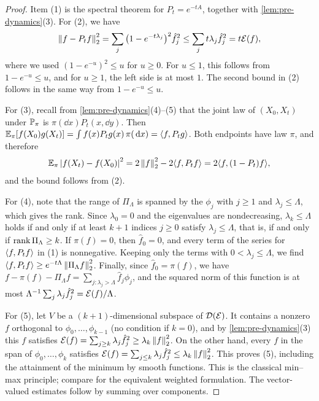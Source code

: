 \begin{proof}
Item (1) is the spectral theorem for $P_t=e^{-tA}$, together with \cref{lem:pre-dynamics}(3). For (2), we have
\[
\left\lVert f-P_tf\right\rVert_2^2=\sum_j\big(1-e^{-t\lambda_j}\big)^2\hat f_j^2\le\sum_jt\lambda_j\hat f_j^2=t\mathcal E(f),
\]
where we used $(1-e^{-u})^2\le u$ for $u\ge0$. For $u\le1$, this follows from $1-e^{-u}\le u$, and for $u\ge1$, the left side is at most $1$. The second bound in (2) follows in the same way from $1-e^{-u}\le u$.

For (3), recall from \cref{lem:pre-dynamics}(4)--(5) that the joint law of $(X_0,X_t)$ under $\mathbb P_\pi$ is $\pi(\dd x)P_t(x,\dd y)$. Then $\mathbb E_\pi[f(X_0)g(X_t)]=\int f(x)P_tg(x)\,\pi(\,\mathrm d x)=\langle f,P_tg\rangle$. Both endpoints have law $\pi$, and therefore
\[
\mathbb E_\pi\left|f(X_t)-f(X_0)\right|^2=2\left\lVert f\right\rVert_2^2-2\langle f,P_tf\rangle=2\langle f,(1-P_t)f\rangle,
\]
and the bound follows from (2).

For (4), note that the range of $\Pi_\Lambda$ is spanned by the $\phi_j$ with $j\ge1$ and $\lambda_j\le\Lambda$, which gives the rank. Since $\lambda_0=0$ and the eigenvalues are nondecreasing, $\lambda_k\le\Lambda$ holds if and only if at least $k+1$ indices $j\ge0$ satisfy $\lambda_j\le\Lambda$, that is, if and only if $\operatorname{rank}\Pi_\Lambda\ge k$. If $\pi(f)=0$, then $\hat f_0=0$, and every term of the series for $\langle f,P_tf\rangle$ in (1) is nonnegative. Keeping only the terms with $0<\lambda_j\le\Lambda$, we find $\langle f,P_tf\rangle\ge e^{-t\Lambda}\left\lVert\Pi_\Lambda f\right\rVert_2^2$. Finally, since $\hat f_0=\pi(f)$, we have $f-\pi(f)-\Pi_\Lambda f=\sum_{j:\lambda_j>\Lambda}\hat f_j\phi_j$, and the squared norm of this function is at most $\Lambda^{-1}\sum_j\lambda_j\hat f_j^2=\mathcal E(f)/\Lambda$.

For (5), let $V$ be a $(k+1)$-dimensional subspace of $\mathcal D(\mathcal E)$. It contains a nonzero $f$ orthogonal to $\phi_0,\dots,\phi_{k-1}$ (no condition if $k=0$), and by \cref{lem:pre-dynamics}(3) this $f$ satisfies $\mathcal E(f)=\sum_{j\ge k}\lambda_j\hat f_j^2\ge\lambda_k\left\lVert f\right\rVert_2^2$. On the other hand, every $f$ in the span of $\phi_0,\dots,\phi_k$ satisfies $\mathcal E(f)=\sum_{j\le k}\lambda_j\hat f_j^2\le\lambda_k\left\lVert f\right\rVert_2^2$. This proves (5), including the attainment of the minimum by smooth functions. This is the classical min--max principle; compare \cite[equation~(2)]{ElSoufiHarrellIliasStubbe2017} for the equivalent weighted formulation. The vector-valued estimates follow by summing over components.
\end{proof}

